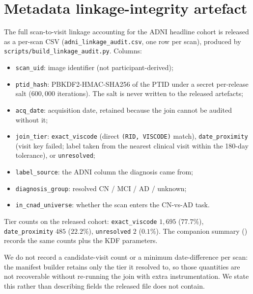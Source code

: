 \documentclass[11pt]{article}
\providecommand{\pb}{\discretionary{}{}{}}
\begin{document}
\section{Metadata linkage-integrity artefact}
\label{sm:linkage_audit}

The full scan-to-visit linkage accounting for the ADNI headline cohort
is released as a per-scan CSV (\texttt{adni\_linkage\_audit.csv}, one
row per scan), produced by
\texttt{scripts/\pb build\_linkage\_audit.py}. Columns:

\begin{itemize}\itemsep=1pt
  \item \texttt{scan\_uid}: image identifier (not participant-derived);
  \item \texttt{ptid\_hash}: PBKDF2-HMAC-SHA256 of the PTID under a
        secret per-release salt ($600{,}000$ iterations). The salt is
        never written to the released artefacts;
  \item \texttt{acq\_date}: acquisition date, retained because the
        join cannot be audited without it;
  \item \texttt{join\_tier}: \texttt{exact\_viscode} (direct
        \texttt{(RID, VISCODE)} match), \texttt{date\_proximity}
        (visit key failed; label taken from the nearest clinical visit
        within the 180-day tolerance), or \texttt{unresolved};
  \item \texttt{label\_source}: the ADNI column the diagnosis came from;
  \item \texttt{diagnosis\_group}: resolved CN / MCI / AD / unknown;
  \item \texttt{in\_cnad\_universe}: whether the scan enters the
        CN-vs-AD task.
\end{itemize}

\noindent
Tier counts on the released cohort: \texttt{exact\_viscode} $1{,}695$
($77.7\%$), \texttt{date\_proximity} $485$ ($22.2\%$),
\texttt{unresolved} $2$ ($0.1\%$). The companion summary
()
records the same counts plus the KDF parameters.

We do not record a candidate-visit count or a minimum date-difference
per scan: the manifest builder retains only the tier it resolved to,
so those quantities are not recoverable without re-running the join
with extra instrumentation. We state this rather than describing
fields the released file does not contain.
\end{document}
